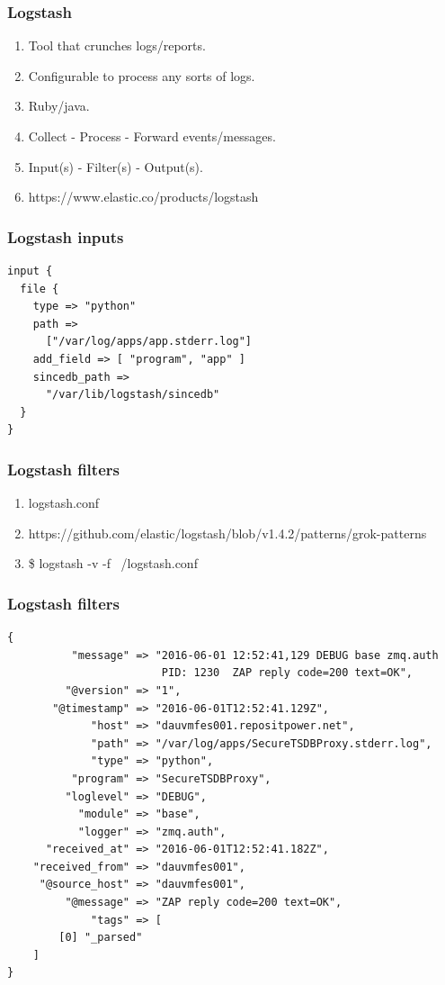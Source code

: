 \documentclass[13pt, ignorenonframetext]{beamer}
\begin{document}
\begin{frame}
\frametitle{Logstash}
\begin{enumerate}
    \item Tool that crunches logs/reports.
    \item Configurable to process any sorts of logs.
    \item Ruby/java.
    \item Collect - Process - Forward events/messages.
    \item Input(s) - Filter(s) - Output(s).
    \item https://www.elastic.co/products/logstash
\end{enumerate}
\end{frame}


\begin{frame}[fragile]
\frametitle{Logstash inputs}
\begin{lstlisting}[basicstyle=\footnotesize]
input {
  file {
    type => "python"
    path => 
      ["/var/log/apps/app.stderr.log"]
    add_field => [ "program", "app" ]
    sincedb_path => 
      "/var/lib/logstash/sincedb"
  }
}
\end{lstlisting}
\end{frame}


\begin{frame}
\frametitle{Logstash filters}
\begin{enumerate}
\item logstash.conf
\item https://github.com/elastic/logstash/blob/v1.4.2/patterns/grok-patterns
\item \$ logstash -v -f ~/logstash.conf
\end{enumerate}
\end{frame}


\begin{frame}[fragile]
\frametitle{Logstash filters}
\begin{lstlisting}[basicstyle=\scriptsize]
{
          "message" => "2016-06-01 12:52:41,129 DEBUG base zmq.auth 
                        PID: 1230  ZAP reply code=200 text=OK",
         "@version" => "1",
       "@timestamp" => "2016-06-01T12:52:41.129Z",
             "host" => "dauvmfes001.repositpower.net",
             "path" => "/var/log/apps/SecureTSDBProxy.stderr.log",
             "type" => "python", 
          "program" => "SecureTSDBProxy",
         "loglevel" => "DEBUG",
           "module" => "base",
           "logger" => "zmq.auth",  
      "received_at" => "2016-06-01T12:52:41.182Z",
    "received_from" => "dauvmfes001",
     "@source_host" => "dauvmfes001",
         "@message" => "ZAP reply code=200 text=OK",
             "tags" => [
        [0] "_parsed"
    ]
}
\end{lstlisting}
\end{frame}
\end{document}

